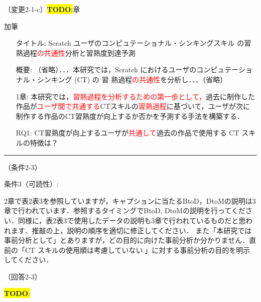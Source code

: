 \documentclass{jarticle} %
\newcommand{\todo}[1]{\colorbox{yellow}{{\bf TODO}:}{\color{blue}{\textbf{[#1]}}}}
\def\subsection#1{ \vspace{1pc} {\gt #1} }
\def\nextans{ \vspace{2pc} \hrule }
\begin{document}
\subsection{（変更2-1-c）\todo{hoge}章}
\vspace{-0.3cm}
\begin{description}
\item 加筆\\
\phantom{　}
\begin{itemize}
\item[タイトル:] Scratch ユーザのコンピュテーショナル・シンキングスキル
の習熟過程\textcolor{red}{の共通性}分析と習熟度到達予測
\item[概要: ] （省略）．．．本研究では，Scratch におけるユーザのコンピュテーショナル・シンキング (CT) の 習
熟過程\textcolor{red}{の共通性}を分析し．．．（省略）
\item[1章:] 本研究では，\textcolor{red}{習熟過程を分析するための第一歩として，}過去に制作した作品が\textcolor{red}{ユーザ間で共通する}CTスキルの\textcolor{red}{習熟過程}に基づいて，ユーザが次に制作する作品のCT習熟度が向上するか否かを予測する手法を構築する．
\item[RQ1:] CT習熟度が向上するユーザが\textcolor{red}{共通して}過去の作品で使用する CT スキルの特徴は？
\end{itemize}
\end{description}



\newpage
\nextans
\subsection{（条件2-3）}

条件3（可読性）: 

2章で表2表3を参照していますが，キャプションに当たるBtoD，DtoMの説明は3章で行われています．参照するタイミングでBtoD, DtoMの説明を行ってください．同様に，表2表3で使用したデータの説明も3章で行われているものだと思われます．推敲の上，説明の順序を適切に修正してください．
また「本研究では事前分析として」とありますが，どの目的に向けた事前分析か分かりません．直前の「CT スキルの使用順は考慮していない.」に対する事前分析の目的を明示してください．

\subsection{（回答2-3）}

\todo{todo}
\end{document}
